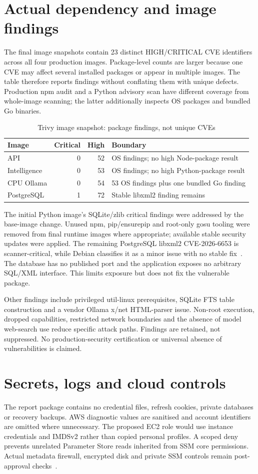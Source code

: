\documentclass[11pt,a4paper,oneside]{report}
\begin{document}
\section{Actual dependency and image findings}
The final image snapshots contain 23 distinct HIGH/CRITICAL CVE identifiers across all four production images. Package-level counts are larger because one CVE may affect several installed packages or appear in multiple images. The table therefore reports findings without conflating them with unique defects. Production npm audit and a Python advisory scan have different coverage from whole-image scanning; the latter additionally inspects OS packages and bundled Go binaries.
\par\begin{table}[htbp]\caption{Trivy image snapshot: package findings, not unique CVEs}\label{tab:security}\small\begin{tabularx}{\linewidth}{YrrY}\toprule Image&Critical&High&Boundary\\\midrule
API&0&52&OS findings; no high Node-package result\\
Intelligence&0&53&OS findings; no high Python-package result\\
CPU Ollama&0&54&53 OS findings plus one bundled Go finding\\
PostgreSQL&1&72&Stable libxml2 finding remains\\\bottomrule\end{tabularx}\end{table}\par
The initial Python image's SQLite/zlib critical findings were addressed by the base-image change. Unused npm, pip/ensurepip and root-only gosu tooling were removed from final runtime images where appropriate; available stable security updates were applied. The remaining PostgreSQL libxml2 CVE-2026-6653 is scanner-critical, while Debian classifies it as a minor issue with no stable fix~\cite{libxml}. The database has no published port and the application exposes no arbitrary SQL/XML interface. This limits exposure but does not fix the vulnerable package.

Other findings include privileged util-linux prerequisites, SQLite FTS table construction and a vendor Ollama x/net HTML-parser issue. Non-root execution, dropped capabilities, restricted network boundaries and the absence of model web-search use reduce specific attack paths. Findings are retained, not suppressed. No production-security certification or universal absence of vulnerabilities is claimed.
\section{Secrets, logs and cloud controls}
The report package contains no credential files, refresh cookies, private databases or recovery backups. AWS diagnostic values are sanitised and account identifiers are omitted where unnecessary. The proposed EC2 role would use instance credentials and IMDSv2 rather than copied personal profiles. A scoped deny prevents unrelated Parameter Store reads inherited from SSM core permissions. Actual metadata firewall, encrypted disk and private SSM controls remain post-approval checks~\cite{imds,ssmsession}.
\FloatBarrier
\end{document}
